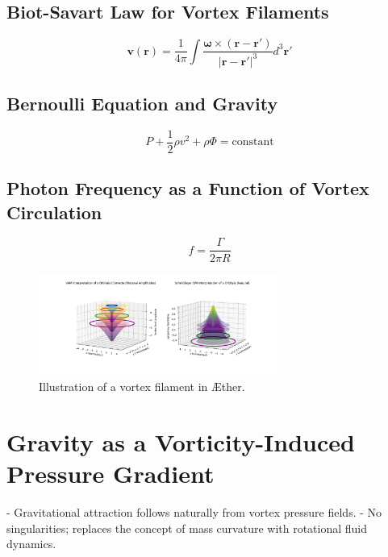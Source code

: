 \documentclass[a4paper,10pt]{article}
\begin{document}
    \subsection{Biot-Savart Law for Vortex Filaments}\label{subsec:biot-savart-law-for-vortex-filaments}
    \begin{equation}
        \mathbf{v}(\mathbf{r}) = \frac{1}{4\pi} \int \frac{\boldsymbol{\omega} \times (\mathbf{r} - \mathbf{r'})}{|\mathbf{r} - \mathbf{r'}|^3} d^3\mathbf{r'}\label{eq:equation}
    \end{equation}

    \subsection{Bernoulli Equation and Gravity}\label{subsec:bernoulli-equation-and-gravity}
    \begin{equation}
        P + \frac{1}{2} \rho v^2 + \rho \Phi = \text{constant}\label{eq:equation2}
    \end{equation}

    \subsection{Photon Frequency as a Function of Vortex Circulation}\label{subsec:photon-frequency-as-a-function-of-vortex-circulation}
    \begin{equation}
        f = \frac{\Gamma}{2\pi R}\label{eq:equation3}
    \end{equation}


    \begin{figure}[h]
        \centering
        \includegraphics[width=0.7\textwidth]{vortex_diagram}
        \caption{Illustration of a vortex filament in Æther.}
        \label{fig:vortex}
    \end{figure}


    \section{Gravity as a Vorticity-Induced Pressure Gradient}\label{sec:gravity-as-a-vorticity-induced-pressure-gradient}
    - Gravitational attraction follows naturally from vortex pressure fields.
    - No singularities; replaces the concept of mass curvature with rotational fluid dynamics.
\end{document}
